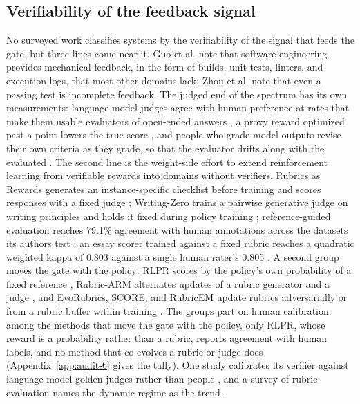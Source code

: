 \documentclass[
  11pt,
]{article}
\begin{document}
\subsection{Verifiability of the feedback signal}\label{app:related-3}

No surveyed work classifies systems by the verifiability of the signal that feeds the gate, but three lines come near it. Guo et al. \cite{guo2026harness} note that software engineering provides mechanical feedback, in the form of builds, unit tests, linters, and execution logs, that most other domains lack; Zhou et al. \cite{zhou2026selfevolvingcoding} note that even a passing test is incomplete feedback. The judged end of the spectrum has its own measurements: language-model judges agree with human preference at rates that make them usable evaluators of open-ended answers \cite{zheng2023judge}, a proxy reward optimized past a point lowers the true score \cite{gao2023overoptimization}, and people who grade model outputs revise their own criteria as they grade, so that the evaluator drifts along with the evaluated \cite{shankar2024validators}. The second line is the weight-side effort to extend reinforcement learning from verifiable rewards into domains without verifiers. Rubrics as Rewards generates an instance-specific checklist before training and scores responses with a fixed judge \cite{gunjal2025rubrics}; Writing-Zero trains a pairwise generative judge on writing principles and holds it fixed during policy training \cite{jia2025writingzero}; reference-guided evaluation reaches 79.1\% agreement with human annotations across the datasets its authors test \cite{shi2026references}; an essay scorer trained against a fixed rubric reaches a quadratic weighted kappa of 0.803 against a single human rater's 0.805 \cite{jin2026rlaes}. A second group moves the gate with the policy: RLPR scores by the policy's own probability of a fixed reference \cite{yu2025rlpr}, Rubric-ARM alternates updates of a rubric generator and a judge \cite{xu2026rubricarm}, and EvoRubrics, SCORE, and RubricEM update rubrics adversarially or from a rubric buffer within training \cite{ding2026evorubrics, zhu2026score, li2026rubricem}. The groups part on human calibration: among the methods that move the gate with the policy, only RLPR, whose reward is a probability rather than a rubric, reports agreement with human labels, and no method that co-evolves a rubric or judge does (Appendix~\ref{app:audit-6} gives the tally). One study calibrates its verifier against language-model golden judges rather than people \cite{plesner2026cheapverifier}, and a survey of rubric evaluation names the dynamic regime as the trend \cite{chen2026rubricsurvey}.
\end{document}
